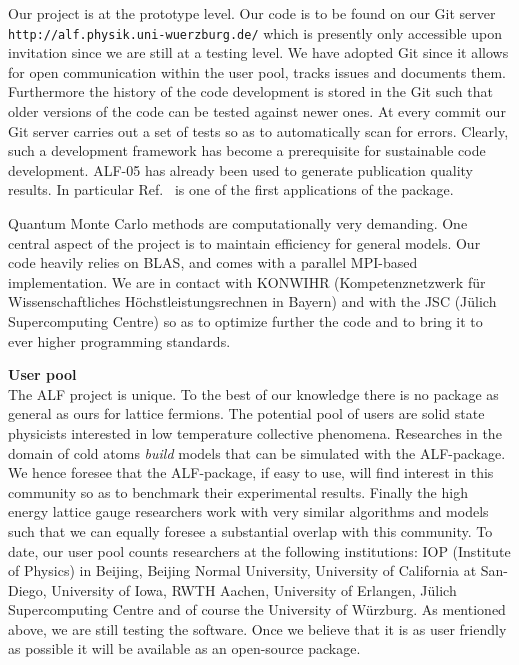 \documentclass[12pt]{article}
\begin{document}
Our project is at the prototype level.  Our code is to be found  on our Git server  \texttt{http://alf.physik.uni-wuerzburg.de/} which is presently only accessible  upon invitation since we are still at a testing level.  We have adopted Git since it allows for open communication within the user pool,  tracks issues and  documents them.   Furthermore the history of the code development is stored in the Git such that older versions of the code can be tested against newer ones.   At every commit our Git server carries out a set of tests so as to automatically scan for errors.   Clearly, such a development framework  has  become a prerequisite for sustainable code development.  ALF-05 has already been used to generate publication quality results. In particular  Ref.~\cite{Assaad16}   is one of the first applications of the package.  

Quantum Monte Carlo methods are  computationally very demanding. One central aspect of the project is to maintain  efficiency for general models.  Our code  heavily relies on BLAS, and comes with a parallel MPI-based implementation. We are in contact with KONWIHR   (Kom\-pe\-tenz\-netz\-werk f\"ur Wissen\-schaft\-liches H\"ochst\-leistungs\-rechnen in Bayern)  and with the JSC (J\"ulich Supercomputing Centre)  so as to optimize further the code and to bring  it to ever higher programming standards.  

{\bf User pool } \\ 
The ALF project  is unique. To the best of our knowledge  there is no package as general as ours for lattice fermions. The potential pool of users are solid state physicists interested in low  temperature collective phenomena.    Researches in the domain of cold atoms {\it build} models that can be simulated with the ALF-package. We hence foresee that the ALF-package, if easy to use, will find interest in this community so as to benchmark their experimental results. Finally  the high energy lattice gauge  researchers work with very similar algorithms and models such that we can equally  foresee  a substantial overlap with this community.   To date,  our user pool counts researchers at the following institutions:  IOP (Institute of Physics) in Beijing,  Beijing Normal University, University of California at San-Diego,  University of Iowa,  RWTH Aachen, University of Erlangen, J\"ulich Supercomputing Centre and of course the  University of W\"urzburg.   As mentioned above,  we are still testing the software. Once we believe that it is as user friendly as possible it will be available as an open-source package. 
\end{document}
